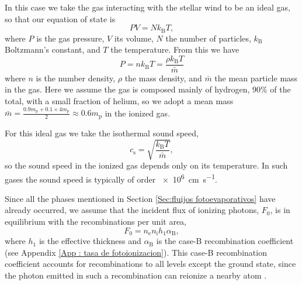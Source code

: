 \documentclass{book}
\begin{document}
In this case we take the gas interacting with the stellar wind to be
an ideal gas, so that our equation of state is
\begin{equation}
    PV = Nk_\mathrm{B}T,
\end{equation}
where $P$ is the gas pressure, $V$ its volume, $N$ the number of
particles, $k_\mathrm{B}$ Boltzmann’s constant, and $T$ the
temperature. From this we have
\begin{equation}
  P = nk_\mathrm{B}T = \frac{\rho k_\mathrm{B} T}{\bar{m}}
\end{equation}
where $n$ is the number density, $\rho$ the mass density, and
$\bar{m}$ the mean particle mass in the gas. Here we assume the gas is
composed mainly of hydrogen, $90\%$ of the total, with a small
fraction of helium, so we adopt a mean mass
$\bar{m}=\frac{0.9 m_\mathrm{p}+0.1\times4m_\mathrm{p}}{2}\approx0.6
m_{\mathrm{p}}$ in the ionized gas.

For this ideal gas we take the isothermal sound speed,
\begin{equation}
    c_\mathrm{s}  = \sqrt{\frac{k_\mathrm{B} T}{\bar{m}}},
\end{equation}
so the sound speed in the ionized gas depends only on its temperature.
In such gases the sound speed is typically of order
\SI{e6}{cm.s^{-1}}.

Since all the phases mentioned in Section
\ref{Sec:fluijos fotoevaporativos} have already occurred, we assume
that the incident flux of ionizing photons, $F_0$, is in equilibrium
with the recombinations per unit area,
\begin{equation}
    F_0 = n_\mathrm{e}n_\mathrm{i}h_1\alpha_\mathrm{B},
\end{equation}
where $h_1$ is the effective thickness and $\alpha_\mathrm{B}$ is the
case-B recombination coefficient (see Appendix \ref{App : tasa de
  fotoionizacion}). This case-B recombination coefficient accounts for
recombinations to all levels except the ground state, since the photon
emitted in such a recombination can reionize a nearby atom
\citep{Dyson:book:1980}.

\end{document}
